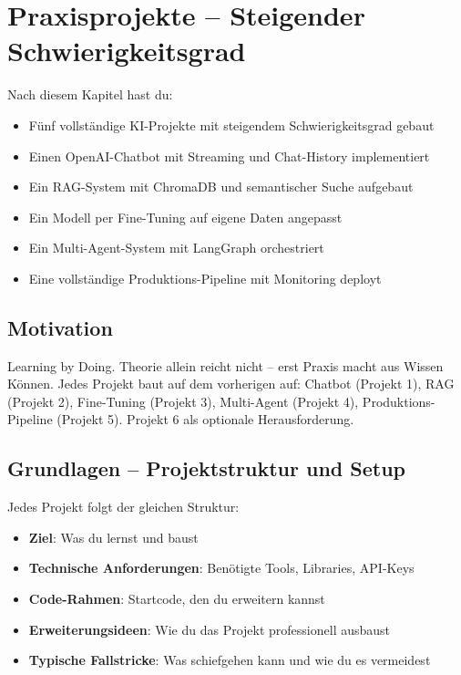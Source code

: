 \chapter{Praxisprojekte -- Steigender Schwierigkeitsgrad}

\label{chap:praxisprojekte}

\begin{lernziele}
Nach diesem Kapitel hast du:
\begin{itemize}
    \item Fünf vollständige KI-Projekte mit steigendem Schwierigkeitsgrad gebaut
    \item Einen OpenAI-Chatbot mit Streaming und Chat-History implementiert
    \item Ein RAG-System mit ChromaDB und semantischer Suche aufgebaut
    \item Ein Modell per Fine-Tuning auf eigene Daten angepasst
    \item Ein Multi-Agent-System mit LangGraph orchestriert
    \item Eine vollständige Produktions-Pipeline mit Monitoring deployt
\end{itemize}
\end{lernziele}

\section{Motivation}

Learning by Doing. Theorie allein reicht nicht -- erst Praxis macht aus Wissen Können. Jedes Projekt baut auf dem vorherigen auf: Chatbot (Projekt 1), RAG (Projekt 2), Fine-Tuning (Projekt 3), Multi-Agent (Projekt 4), Produktions-Pipeline (Projekt 5). Projekt 6 als optionale Herausforderung.

\section{Grundlagen -- Projektstruktur und Setup}

Jedes Projekt folgt der gleichen Struktur:

\begin{itemize}[leftmargin=*]
    \item \textbf{Ziel}: Was du lernst und baust
    \item \textbf{Technische Anforderungen}: Benötigte Tools, Libraries, API-Keys
    \item \textbf{Code-Rahmen}: Startcode, den du erweitern kannst
    \item \textbf{Erweiterungsideen}: Wie du das Projekt professionell ausbaust
    \item \textbf{Typische Fallstricke}: Was schiefgehen kann und wie du es vermeidest
\end{itemize}

